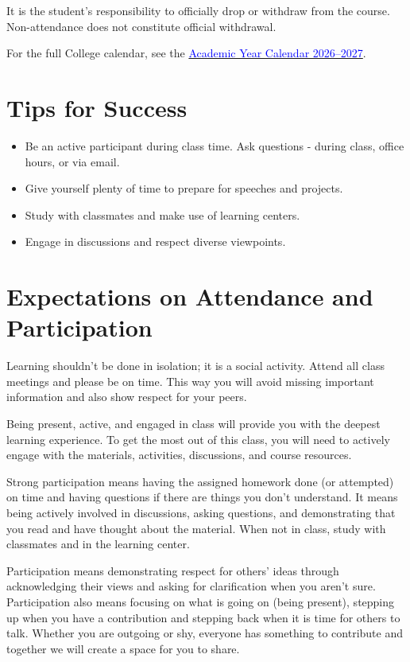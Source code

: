 \documentclass{exam}
\begin{document}
It is the student's responsibility to officially drop or withdraw from the course. Non-attendance does not constitute official withdrawal.

For the full College calendar, see the \href{https://www.montgomerycollege.edu/_documents/academics/academic-calendar-2026-2027.pdf}{\textcolor{blue}{Academic Year Calendar 2026--2027}}.

\section*{Tips for Success}
\begin{itemize}
    \item Be an active participant during class time. Ask questions - during class, office hours, or via email.
    \item Give yourself plenty of time to prepare for speeches and projects.
    \item Study with classmates and make use of learning centers.
    \item Engage in discussions and respect diverse viewpoints.
\end{itemize}

\section*{Expectations on Attendance and Participation}

Learning shouldn't be done in isolation; it is a social activity. Attend all class meetings and please be on time. This way you will avoid missing important information and also show respect for your peers.

Being present, active, and engaged in class will provide you with the deepest learning experience. To get the most out of this class, you will need to actively engage with the materials, activities, discussions, and course resources.

Strong participation means having the assigned homework done (or attempted) on time and having questions if there are things you don't understand. It means being actively involved in discussions, asking questions, and demonstrating that you read and have thought about the material. When not in class, study with classmates and in the learning center.

Participation means demonstrating respect for others' ideas through acknowledging their views and asking for clarification when you aren't sure. Participation also means focusing on what is going on (being present), stepping up when you have a contribution and stepping back when it is time for others to talk. Whether you are outgoing or shy, everyone has something to contribute and together we will create a space for you to share.
\end{document}
